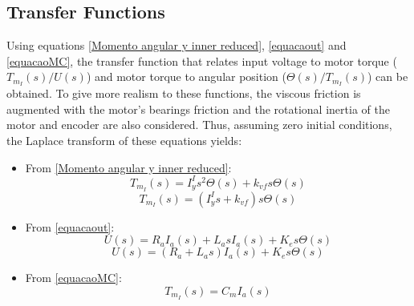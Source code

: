 \subsection{Transfer Functions}
Using equations \eqref{Momento angular y inner reduced}, \eqref{equacaout} and \eqref{equacaoMC}, the transfer function that relates input voltage to motor torque ($T_{m_I}(s)/U(s)$) and motor torque to angular position ($\Theta (s)/T_{m_I}(s)$) can be obtained. To give more realism to these functions, the viscous friction is augmented with the motor's bearings friction and the rotational inertia of the motor and encoder are also considered. Thus, assuming zero initial conditions, the Laplace transform of these equations yields:
\begin{itemize}
\item From \eqref{Momento angular y inner reduced}:
\begin{equation*}
    T_{m_I}(s) = I_y^I s^2 \Theta(s) + k_{vf} s \Theta(s)
\end{equation*}
\begin{equation}
	\label{3.8}
    T_{m_I}(s) = (I_y^I s + k_{vf}) s \Theta(s)
\end{equation}
\item From \eqref{equacaout}:
\begin{equation*}
    U(s) = R_a I_a(s) + L_a s I_a(s) + K_e s \Theta(s)
\end{equation*}
\begin{equation}
	\label{equacaodomotordclaplace}
    U(s) = (R_a + L_a s)I_a(s) + K_e s \Theta(s)
\end{equation}
\item From \eqref{equacaoMC}:
\begin{equation}
	\label{3.10}
    T_{m_I}(s) = C_m I_a(s)
\end{equation}
\end{itemize}

